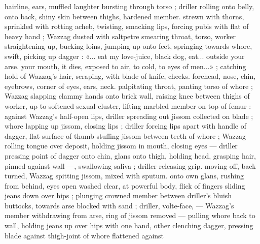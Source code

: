 hairline, ears, muffled laughter bursting through torso ; driller rolling
onto belly, onto back, shiny skin between thighs, hardened member.
strewn with thorns, sprinkled with rotting acheb, twisting, smacking
lips, forcing pubis with flat of heavy hand ; Wazzag dusted with
saltpetre smearing throat, torso, worker straightening up, bucking
loins, jumping up onto feet, springing towards whore, swift, picking
up dagger : «... eat my love-juice, black dog, eat... outside your arse.
your mouth, it dies, exposed to air, to cold, to eyes of men...» ;
catching hold of Wazzag's hair, scraping, with blade of knife, cheeks.
forehead, nose, chin, eyebrows, corner of eyes, ears, neck.
palpitating throat, panting torso of whore ; Wazzag slapping clammy
hands onto brick wall, raising knee between thighs of worker, up to
softened sexual cluster, lifting marbled member on top of femur :
against Wazzag's half-open lips, driller spreading out jissom
collected on blade ; whore lapping up jissom, closing lips ; driller
forcing lips apart with handle of dagger, flat surface of thumb
stuffing jissom between teeth of whore ; Wazzag rolling tongue over
deposit, holding jissom in mouth, closing eyes — driller pressing
point of dagger onto chin, glans onto thigh, holding head, grasping
hair, pinned against wall —, swallowing saliva ; driller releasing grip.
moving off, back turned, Wazzag spitting jissom, mixed with sputum.
onto own glans, rushing from behind, eyes open washed clear, at
powerful body, flick of fingers sliding jeans down over hips ; plunging
crowned member between driller's bluish buttocks, towards arse
blocked with sand ; driller, volte-face, — Wazzag's member
withdrawing from arse, ring of jissom removed — pulling whore back
to wall, holding jeans up over hips with one hand, other clenching
dagger, pressing blade against thigh-joint of whore flattened against

